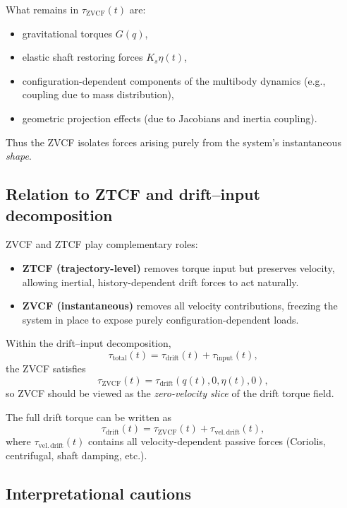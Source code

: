 \documentclass[12pt]{article}
\begin{document}
What remains in \(\tau_{\mathrm{ZVCF}}(t)\) are:
\begin{itemize}
  \item gravitational torques \(G(q)\),
  \item elastic shaft restoring forces \(K_s \eta(t)\),
  \item configuration-dependent components of the multibody dynamics (e.g., coupling due to mass distribution),
  \item geometric projection effects (due to Jacobians and inertia coupling).
\end{itemize}

Thus the ZVCF isolates forces arising purely from the system’s instantaneous \emph{shape}.

\subsection{Relation to ZTCF and drift--input decomposition}

ZVCF and ZTCF play complementary roles:
\begin{itemize}
  \item \textbf{ZTCF (trajectory-level)} removes torque input but preserves velocity, allowing inertial, history-dependent drift forces to act naturally.
  \item \textbf{ZVCF (instantaneous)} removes all velocity contributions, freezing the system in place to expose purely configuration-dependent loads.
\end{itemize}

Within the drift--input decomposition,
\[
  \tau_{\mathrm{total}}(t) = \tau_{\mathrm{drift}}(t) + \tau_{\mathrm{input}}(t),
\]
the ZVCF satisfies
\[
  \tau_{\mathrm{ZVCF}}(t) = \tau_{\mathrm{drift}}(q(t),0,\eta(t),0),
\]
so ZVCF should be viewed as the \emph{zero-velocity slice} of the drift torque field.

The full drift torque can be written as
\begin{equation}
  \tau_{\text{drift}}(t)
  =
  \tau_{\mathrm{ZVCF}}(t)
  +
  \tau_{\mathrm{vel.\,drift}}(t),
  \label{eq:zvcf_split}
\end{equation}
where \(\tau_{\mathrm{vel.\,drift}}(t)\) contains all velocity-dependent passive forces (Coriolis, centrifugal, shaft damping, etc.).

\subsection{Interpretational cautions}
\end{document}
